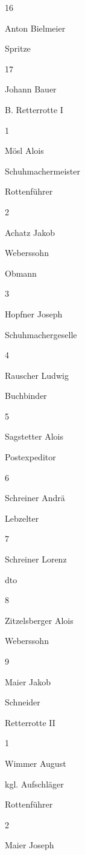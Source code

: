 \documentclass[12pt,a4paper]{book}
\begin{document}
16

Anton Bielmeier



Spritze

17

Johann Bauer







B. Retterrotte I

1

Mösl Alois

Schuhmachermeister

Rottenführer

2

Achatz Jakob

Weberssohn

Obmann

3

Hopfner Joseph

Schuhmachergeselle



4

Rauscher Ludwig

Buchbinder



5

Sagstetter Alois

Postexpeditor



6

Schreiner Andrä

Lebzelter



7

Schreiner Lorenz

dto



8

Zitzelsberger Alois

Weberssohn



9

Maier Jakob

Schneider





Retterrotte II

1

Wimmer August

kgl. Aufschläger

Rottenführer

2

Maier Joseph
\end{document}
